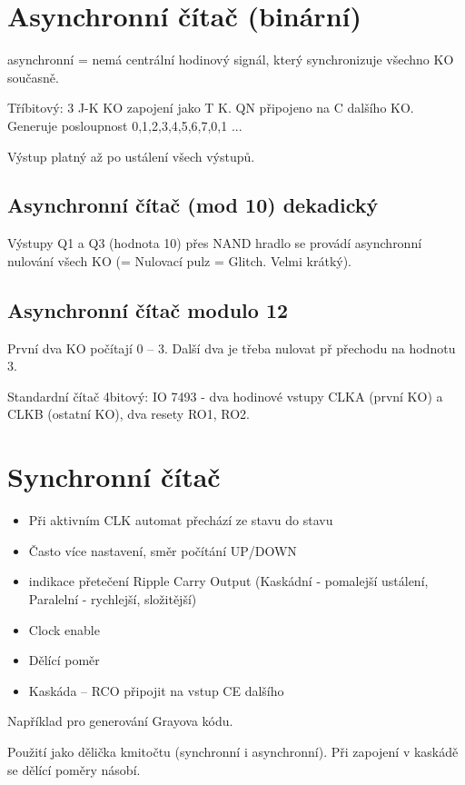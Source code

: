 \documentclass[a4paper, 11pt]{report}
\begin{document}
\section{Asynchronní čítač (binární)}

asynchronní = nemá centrální hodinový signál, který synchronizuje všechno KO současně.

Tříbitový: 3 J-K KO zapojení jako T K. QN připojeno na C dalšího KO. Generuje posloupnost 0,1,2,3,4,5,6,7,0,1 ...

Výstup platný až po ustálení všech výstupů.

\subsection{Asynchronní čítač (mod 10) dekadický}

Výstupy Q1 a Q3 (hodnota 10) přes NAND hradlo se provádí asynchronní nulování všech KO (= Nulovací pulz = Glitch. Velmi krátký).

\subsection{Asynchronní čítač modulo 12}

První dva KO počítají 0 -- 3. Další dva je třeba nulovat př přechodu na hodnotu 3.

Standardní čítač 4bitový: IO 7493 - dva hodinové vstupy CLKA (první KO) a CLKB (ostatní KO), dva resety RO1, RO2.

\section{Synchronní čítač}

\begin{itemize}
	\item Při aktivním CLK automat přechází ze stavu do stavu
	\item Často více nastavení, směr počítání UP/DOWN
	\item indikace přetečení Ripple Carry Output (Kaskádní - pomalejší ustálení, Paralelní - rychlejší, složitější)
	\item Clock enable
	\item Dělící poměr
	\item Kaskáda -- RCO připojit na vstup CE dalšího
\end{itemize}

Například pro generování Grayova kódu.

Použití jako dělička kmitočtu (synchronní i asynchronní). Při zapojení v kaskádě se dělící poměry násobí.
\end{document}
